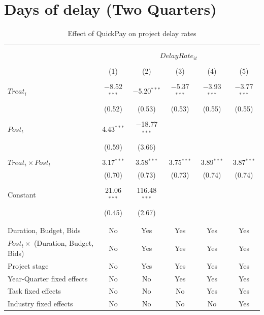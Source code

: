 \documentclass[
]{article}
\begin{document}
\hypertarget{days-of-delay-two-quarters}{%
\section{Days of delay (Two
Quarters)}\label{days-of-delay-two-quarters}}

\begin{table}[H] \centering 
  \caption{Effect of QuickPay on project delay rates} 
  \label{} 
\small 
\begin{tabular}{@{\extracolsep{-2pt}}lccccc} 
\\[-1.8ex]\hline 
\hline \\[-1.8ex] 
\\[-1.8ex] & \multicolumn{5}{c}{$DelayRate_{it}$} \\ 
\\[-1.8ex] & (1) & (2) & (3) & (4) & (5)\\ 
\hline \\[-1.8ex] 
 $Treat_i$ & $-$8.52$^{***}$ & $-$5.20$^{***}$ & $-$5.37$^{***}$ & $-$3.93$^{***}$ & $-$3.77$^{***}$ \\ 
  & (0.52) & (0.53) & (0.53) & (0.55) & (0.55) \\ 
  & & & & & \\ 
 $Post_t$ & 4.43$^{***}$ & $-$18.77$^{***}$ &  &  &  \\ 
  & (0.59) & (3.66) &  &  &  \\ 
  & & & & & \\ 
 $Treat_i \times Post_t$ & 3.17$^{***}$ & 3.58$^{***}$ & 3.75$^{***}$ & 3.89$^{***}$ & 3.87$^{***}$ \\ 
  & (0.70) & (0.73) & (0.73) & (0.74) & (0.74) \\ 
  & & & & & \\ 
 Constant & 21.06$^{***}$ & 116.48$^{***}$ &  &  &  \\ 
  & (0.45) & (2.67) &  &  &  \\ 
  & & & & & \\ 
\hline \\[-1.8ex] 
Duration, Budget, Bids & No & Yes & Yes & Yes & Yes \\ 
$Post_t \times$  (Duration, Budget, Bids) & No & Yes & Yes & Yes & Yes \\ 
Project stage & No & Yes & Yes & Yes & Yes \\ 
Year-Quarter fixed effects & No & No & Yes & Yes & Yes \\ 
Task fixed effects & No & No & No & Yes & Yes \\ 
Industry fixed effects & No & No & No & No & Yes \\ 

\end{tabular}
\end{table}
\end{document}
